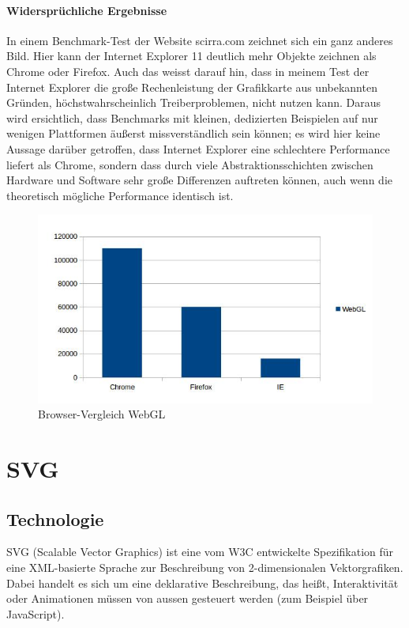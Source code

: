 \documentclass[a4paper, 12pt]{article}
\begin{document}
\paragraph{Widersprüchliche Ergebnisse} In einem Benchmark-Test der Website scirra.com zeichnet sich ein ganz anderes Bild. Hier kann der Internet Explorer 11 deutlich mehr Objekte zeichnen als Chrome oder Firefox. Auch das weisst darauf hin, dass in meinem Test der Internet Explorer die große Rechenleistung der Grafikkarte aus unbekannten Gründen, höchstwahrscheinlich Treiberproblemen, nicht nutzen kann. Daraus wird ersichtlich, dass Benchmarks mit kleinen, dedizierten Beispielen auf nur wenigen Plattformen äußerst missverständlich sein können; es wird hier keine Aussage darüber getroffen, dass Internet Explorer eine schlechtere Performance liefert als Chrome, sondern dass durch viele Abstraktionsschichten zwischen Hardware und Software sehr große Differenzen auftreten können, auch wenn die theoretisch mögliche Performance identisch ist.
\begin{figure}[H]
	\includegraphics[width=\textwidth]{assets/browser_comp_webgl} 
	\caption{Browser-Vergleich WebGL}
	\label{browser_comp_webgl}
\end{figure}
\newpage
\section{SVG}
\subsection{Technologie}
SVG (Scalable Vector Graphics) ist eine vom W3C entwickelte Spezifikation für eine XML-basierte Sprache zur Beschreibung von 2-dimensionalen Vektorgrafiken. Dabei handelt es sich um eine deklarative Beschreibung, das heißt, Interaktivität oder Animationen müssen von aussen gesteuert werden (zum Beispiel über JavaScript).
\end{document}

